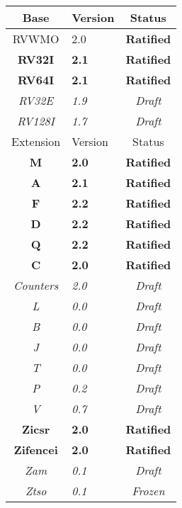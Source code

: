 {
\begin{table}[hbt]
  \centering
  \begin{tabular}{|c|l|c|}
    \hline
    Base           & Version & Status\\
    \hline
    RVWMO          & 2.0 & \bf Ratified   \\
    \bf RV32I      & \bf 2.1 & \bf Ratified \\
    \bf RV64I      & \bf 2.1 & \bf Ratified \\
    \em RV32E      & \em 1.9 & \em Draft \\
    \em RV128I     & \em 1.7 & \em Draft \\
    \hline
    Extension      & Version & Status \\
    \hline
    \bf M          & \bf 2.0 & \bf Ratified \\
    \bf A          & \bf 2.1 & \bf Ratified \\
    \bf F          & \bf 2.2 & \bf Ratified \\
    \bf D          & \bf 2.2 & \bf Ratified \\
    \bf Q          & \bf 2.2 & \bf Ratified \\
    \bf C          & \bf 2.0 & \bf Ratified \\
    \em Counters   & \em 2.0 & \em Draft \\
    \em L          & \em 0.0 & \em Draft \\
    \em B          & \em 0.0 & \em Draft \\
    \em J          & \em 0.0 & \em Draft \\
    \em T          & \em 0.0 & \em Draft \\
    \em P          & \em 0.2 & \em Draft \\
    \em V          & \em 0.7 & \em Draft \\
    \bf Zicsr      & \bf 2.0 & \bf Ratified \\
    \bf Zifencei   & \bf 2.0 & \bf Ratified \\
    \em Zam        & \em 0.1 & \em Draft \\
    \em Ztso       & \em 0.1 & \em Frozen \\
    \hline
  \end{tabular}
\end{table}
}


